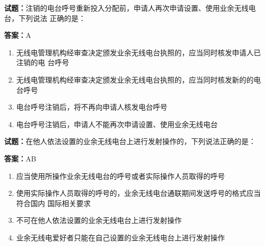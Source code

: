 \documentclass{ctexbook}
\begin{document}




\vspace{1em}

\textbf{试题：}注销的电台呼号重新投入分配前，申请人再次申请设置、使用业余无线电台，下列说法
正确的是： 

\textbf{答案：}A 

\begin{enumerate}[leftmargin=3em]
  \item 无线电管理机构经审查决定颁发业余无线电台执照的，应当同时核发申请人已注销的电
台呼号 

  \item 无线电管理机构经审查决定颁发业余无线电台执照的，应当同时核发新的的电台呼号 

  \item 电台呼号注销后，将不再向申请人核发电台呼号 

  \item 电台呼号注销后，申请人不能再次申请设置、使用业余无线电台 

\end{enumerate}





\vspace{1em}

\textbf{试题：}在他人依法设置的业余无线电台上进行发射操作的，下列说法正确的是： 

\textbf{答案：}AB 


\begin{enumerate}[leftmargin=3em]
  \item 应当使用所操作业余无线电台的呼号或者实际操作人员取得的呼号 

  \item 使用实际操作人员取得的呼号的，业余无线电台通联期间发送呼号的格式应当符合国内
国际相关要求 

  \item 不可在他人依法设置的业余无线电台上进行发射操作 

  \item 业余无线电爱好者只能在自己设置的业余无线电台上进行发射操作 

\end{enumerate}



\end{document}
